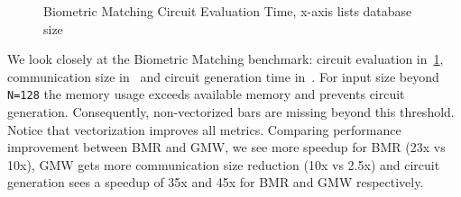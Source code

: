 

\begin{figure}[htbp]
\centering
\resizebox{0.7\columnwidth}{!}{}
\caption{Biometric Matching Circuit Evaluation Time, x-axis lists database size}
\label{fig:graph_biometric_eval_time}
\end{figure}

\begin{comment}
\begin{figure}[htbp]
\centering
\resizebox{0.7\columnwidth}{!}{}
\caption{Biometric Matching Communication Size, x-axis lists database size}
\label{fig:graph_biometic_comm_size}
\end{figure}

\begin{figure}[htbp]
\centering
\resizebox{0.7\columnwidth}{!}{}
\caption{Biometric Matching Circuit Generation Time, x-axis lists database size}
\label{fig:graph_biometic_circ_gen_time}
\end{figure}
\end{comment}

We look closely at the Biometric Matching benchmark: circuit evaluation in~\cref{fig:graph_biometric_eval_time}, communication size in~\cite{Anon_TR} and circuit generation time in~\cite{Anon_TR}.
For input size beyond {\tt N=128} the memory usage exceeds available memory and prevents circuit generation. Consequently, non-vectorized bars are missing beyond this threshold. Notice that vectorization improves all metrics. %
Comparing performance improvement between BMR and GMW, we see more speedup for BMR (23x vs 10x), GMW gets more communication size reduction (10x vs 2.5x) and circuit generation sees a speedup of 35x and 45x for BMR and GMW respectively. 



